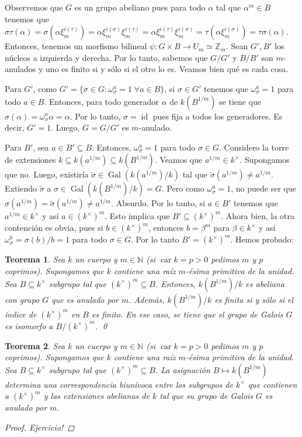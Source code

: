 \documentclass[12pt]{book}
\newtheorem{teo}{Teorema}[section]
\theoremstyle{definition}
\newcommand{\ZZ}{\mathbb{Z}}      %
\newcommand{\NN}{\mathbb{N}}
\DeclareMathOperator{\id}{id}
\DeclareMathOperator{\car}{car}
\DeclareMathOperator{\Gal}{Gal}
\begin{document}
Observemos que $G$ es un grupo abeliano pues para todo $\alpha$ tal que $\alpha^m\in B$ tenemos que $\sigma\tau(\alpha) = \sigma(\alpha\xi_m^{i(\tau)}) = \alpha\xi_m^{i(\sigma)}\xi_m^{i(\tau)} = \alpha\xi_m^{i(\tau)}\xi_m^{i(\sigma)} = \tau(\alpha\xi_m^{i(\sigma)}) = \tau\sigma(\alpha)$. Entonces, tenemos un morfismo bilineal $\psi:G\times B\to U_m\simeq \ZZ_m$. Sean $G',B'$ los núcleos a izquierda y derecha. Por lo tanto, sabemos que $G/G'$ y $B/B'$ son $m$-anulados y uno es finito si y sólo si el otro lo es. Veamos bien qué es cada cosa.

Para $G'$, como $G'=\{\sigma\in G : \omega_\sigma^a = 1\;\forall a\in B\}$, si $\sigma\in G'$ tenemos que $\omega_\sigma^a = 1$ para todo $a\in B$. Entonces, para todo generador $\alpha$ de $k(B^{1/m})$ se tiene que $\sigma(\alpha) = \omega_\sigma^a \alpha = \alpha$. Por lo tanto, $\sigma = \id$ pues fija a todos los generadores. Es decir, $G'=1$. Luego, $G = G/G'$ es $m$-anulado.

Para $B'$, sea $a\in B'\subseteq B$. Entonces, $\omega_\sigma^a = 1$ para todo $\sigma\in G$. Considero la torre de extensiones $k\subseteq k(a^{1/m})\subseteq k(B^{1/m})$. Veamos que $a^{1/m}\in k^\times$. Supongamos que no. Luego, existiría $\widetilde{\sigma}\in \Gal(k(a^{1/m})/k)$ tal que $\widetilde{\sigma}(a^{1/m})\neq a^{1/m}$. Extiendo $\widetilde{\sigma}$ a $\sigma\in \Gal(k(B^{1/m})/k)=G$. Pero como $\omega_\sigma^a=1$, no puede ser que $\sigma(a^{1/m}) = \widetilde{\sigma}(a^{1/m}) \neq a^{1/m}$. Absurdo. Por lo tanto, si $a\in B'$ tenemos que $a^{1/m}\in k^\times$ y así $a \in (k^\times)^m$. Esto implica que $B'\subseteq (k^\times)^m$. Ahora bien, la otra contención es obvia, pues si $b\in (k^\times)^m$, entonces $b= \beta^m$ para $\beta\in k^\times$ y así $\omega_\sigma^b = \sigma(b)/b = 1$ para todo $\sigma\in G$. Por lo tanto $B' = (k^\times)^m$. Hemos probado:

\begin{teo}
Sea $k$ un cuerpo y $m\in\NN$ (si $\car k =p>0$ pedimos $m$ y $p$ coprimos). Supongamos que $k$ contiene una raíz $m$-ésima primitiva de la unidad. Sea $B\subseteq k^\times$ subgrupo tal que $(k^\times)^m\subseteq B$. Entonces, $k(B^{1/m})/k$ es abeliana con grupo $G$ que es anulado por $m$. Además, $k(B^{1/m})/k$ es finita si y sólo si el índice de $(k^\times)^m$ en $B$ es finito. En ese caso, se tiene que el grupo de Galois $G$ es isomorfo a $B/(k^\times)^m$. \qed
\end{teo}

\begin{teo}
Sea $k$ un cuerpo y $m\in\NN$ (si $\car k =p>0$ pedimos $m$ y $p$ coprimos). Supongamos que $k$ contiene una raíz $m$-ésima primitiva de la unidad. Sea $B\subseteq k^\times$ subgrupo tal que $(k^\times)^m\subseteq B$. La asignación $B\mapsto k(B^{1/m})$ determina una correspondencia biunívoca entre los subgrupos de $k^\times$ que contienen a $(k^\times)^m$ y las extensiones abelianas de $k$ tal que su grupo de Galois $G$ es anulado por $m$.
\begin{proof}
Ejercicio!
\end{proof}
\end{teo}
\end{document}
